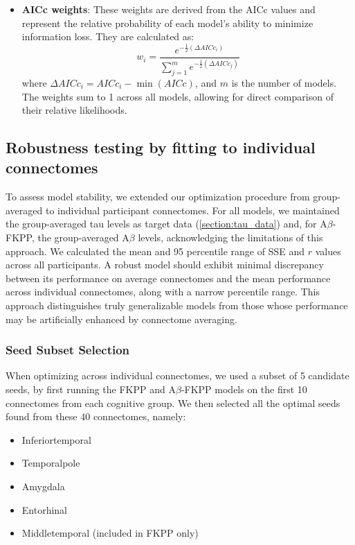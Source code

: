 \begin{itemize}
    \item \textbf{AICc weights}: These weights are derived from the AICc values and represent the relative probability of each model's ability to minimize information loss. They are calculated as:
    $$w_i = \frac{e^{-\frac{1}{2}(\Delta AICc_i)}}{\sum_{j=1}^{m} e^{-\frac{1}{2}(\Delta AICc_j)}}$$
    where $\Delta AICc_i = AICc_i - \min(AICc)$, and $m$ is the number of models. The weights sum to 1 across all models, allowing for direct comparison of their relative likelihoods.


\end{itemize}


\subsection{Robustness testing by fitting to individual connectomes} 
To assess model stability, we extended our optimization procedure from group-averaged to individual participant connectomes. For all models, we maintained the group-averaged tau levels as target data (\autoref{section:tau_data}) and, for A$\beta$-FKPP, the group-averaged A$\beta$ levels, acknowledging the limitations of this approach. We calculated the mean and 95 percentile range of SSE and $r$ values across all participants. A robust model should exhibit minimal discrepancy between its performance on average connectomes and the mean performance across individual connectomes, along with a narrow percentile range. This approach distinguishes truly generalizable models from those whose performance may be artificially enhanced by connectome averaging. \\



\subsubsection{Seed Subset Selection}
When optimizing across individual connectomes, we used a subset of 5 candidate seeds, by first running the FKPP and A$\beta$-FKPP models on the first 10 connectomes from each cognitive group. We then selected all the optimal seeds found from these 40 connectomes, namely:
\begin{itemize}
    \item Inferiortemporal
    \item Temporalpole
    \item Amygdala
    \item Entorhinal
    \item Middletemporal (included in FKPP only)
\end{itemize}


